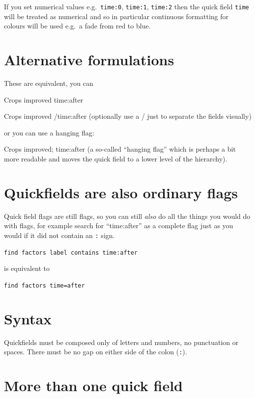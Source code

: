 \documentclass[
]{book}
\begin{document}
If you set numerical values e.g.~\texttt{time:0}, \texttt{time:1}, \texttt{time:2} then the quick field \texttt{time} will be treated as numerical and so in particular continuous formatting for colours will be used e.g.~a fade from red to blue.

\hypertarget{alternative-formulations}{%
\section{Alternative formulations}\label{alternative-formulations}}

These are equivalent, you can

Crops improved time:after

Crops improved /time:after (optionally use a / just to separate the fields visually)

or you can use a hanging flag:

Crops improved; time:after (a so-called ``hanging flag'' which is perhaps a bit more readable and moves the quick field to a lower level of the hierarchy).

\hypertarget{quickfields-are-also-ordinary-flags}{%
\section{Quickfields are also ordinary flags}\label{quickfields-are-also-ordinary-flags}}

Quick field flags are still flags, so you can still \emph{also} do all the things you would do with flags, for example search for ``time:after'' as a complete flag just as you would if it did not contain an \texttt{:} sign.

\texttt{find\ factors\ label\ contains\ time:after}

is equivalent to

\texttt{find\ factors\ time=after}

\hypertarget{syntax}{%
\section{Syntax}\label{syntax}}

Quickfields must be composed only of letters and numbers, no punctuation or spaces. There must be no gap on either side of the colon (\texttt{:}).

\hypertarget{more-than-one-quick-field}{%
\section{More than one quick field}\label{more-than-one-quick-field}}
\end{document}
